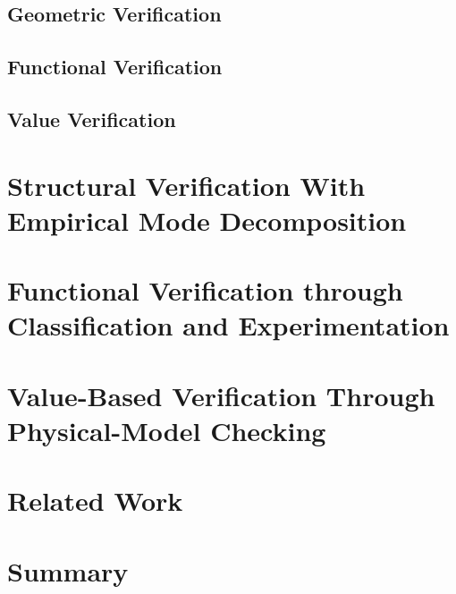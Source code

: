 \subsection{Geometric Verification}
\subsection{Functional Verification}
\subsection{Value Verification}

\section{Structural Verification With Empirical Mode Decomposition}









\section{Functional Verification through Classification and Experimentation}
\section{Value-Based Verification Through Physical-Model Checking}
\section{Related Work}
\section{Summary}


